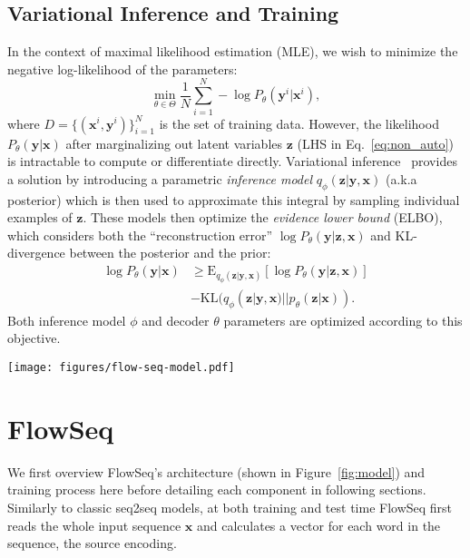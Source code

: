 \documentclass[11pt,a4paper]{article}
\newcommand{\xv}{\mathbf{x}}
\newcommand{\yv}{\mathbf{y}}
\newcommand{\zv}{\mathbf{z}}
\begin{document}
\subsection{Variational Inference and Training}
\label{subsec:vlf}
In the context of maximal likelihood estimation (MLE), we wish to minimize the negative log-likelihood of the parameters:
\begin{equation}\label{eq:mle}
\min\limits_{\theta \in \Theta} \frac{1}{N} \sum\limits_{i=1}^{N} -\log P_{\theta}(\yv^i | \xv^i),
\end{equation}
where $D=\{(\xv^i, \yv^i)\}_{i=1}^{N}$ is the set of training data.
However, the likelihood $P_{\theta}(\yv | \xv)$ after marginalizing out latent variables $\zv$ (LHS in Eq.~\eqref{eq:non_auto}) is intractable to compute or differentiate directly.
Variational inference~\citep{wainwright2008graphical} provides a solution by introducing a parametric \emph{inference model} $q_{\phi}(\zv|\yv, \xv)$ (a.k.a posterior) which is then used to approximate this integral by sampling individual examples of $\zv$.
These models then optimize the \emph{evidence lower bound} (ELBO), which considers both the ``reconstruction error'' $\log P_\theta(\yv|\zv,\xv)$ and KL-divergence between the posterior and the prior:
\begin{align}\label{eq:elbo}
\log P_{\theta}(\yv | \xv) & \geq \mathrm{E}_{q_{\phi} (\zv|\yv, \xv)} [\log P_{\theta}(\yv|\zv, \xv)] \nonumber \\
 & - \mathrm{KL}(q_{\phi} (\zv|\yv, \xv) || p_{\theta}(\zv|\xv)).
\end{align}
Both inference model $\phi$ and decoder $\theta$ parameters are optimized according to this objective.

\begin{figure*}[tb]
  \centering
  \texttt{[image: figures/flow-seq-model.pdf]}
  \caption{Neural architecture of FlowSeq, including the encoder, the decoder and the posterior networks, together with the multi-scale architecture of the prior flow. The architecture of each flow step is in Figure~\ref{fig:flowstep}. 
} \label{fig:model}
  \vspace{-4mm}
\end{figure*}

\section{FlowSeq}
\label{sec:flowseq}

We first overview FlowSeq's architecture (shown in Figure~\ref{fig:model}) and training process here before detailing each component in following sections.
Similarly to classic seq2seq models, at both training and test time FlowSeq first reads the whole input sequence $\xv$ and calculates a vector for each word in the sequence, the source encoding.
\end{document}

